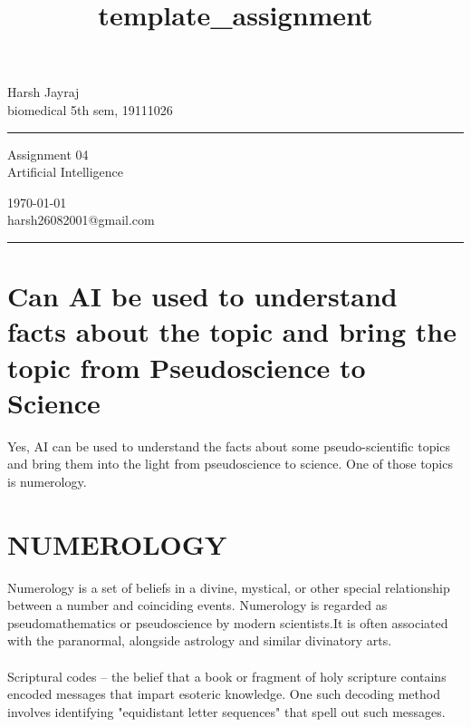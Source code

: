 \documentclass[a4paper,10pt]{article} %
\begin{document}

\title{template_assignment} %
\fancyhead[C]{}
\begin{minipage}{0.295\textwidth} %
\raggedright
Harsh Jayraj\\ %
\footnotesize %
biomedical 5th sem, 19111026 %
\medskip\hrule
\end{minipage}
\begin{minipage}{0.4\textwidth} %
\centering 
\large %
Assignment 04\\ %
\normalsize %
Artificial Intelligence\\ %
\end{minipage}
\begin{minipage}{0.295\textwidth} %
\raggedleft
\today\\ %
\footnotesize %
harsh26082001@gmail.com%
\medskip\hrule
\end{minipage}


\section{\color{brown}Can AI be used to understand facts about the topic and bring the topic from Pseudoscience to Science }
Yes, AI can be used to understand the facts about some pseudo-scientific topics and bring them into the light from pseudoscience to science. One of those topics is numerology.
\bigskip
\section{\color{brown}NUMEROLOGY}
Numerology is a set of beliefs in a divine, mystical, or other special relationship between a number and coinciding events. Numerology is regarded as pseudomathematics or pseudoscience by modern scientists.It is often associated with the paranormal, alongside astrology and similar divinatory arts.\\\\
Scriptural codes – the belief that a book or fragment of holy scripture contains encoded messages that impart esoteric knowledge. One such decoding method involves identifying "equidistant letter sequences" that spell out such messages.
\bigskip
\end{document}
